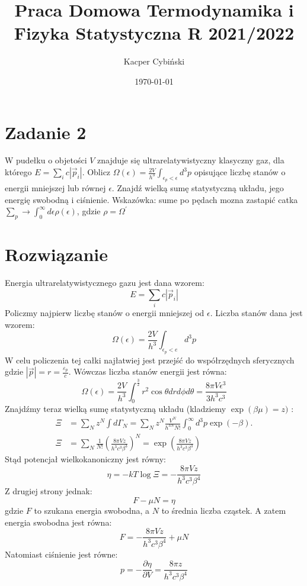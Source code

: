 \documentclass[12pt,a4paper]{article}
\title{Praca Domowa Termodynamika i Fizyka Statystyczna R 2021/2022}
\author{Kacper Cybiński}
\date{\today}
\begin{document}
\maketitle

\section{Zadanie 2}

W pudełku o objetości $V$ znajduje się ultrarelatywistyczny klasyczny gaz, dla którego $E=\sum_{i} c\left|\vec{p}_{i}\right|$. Oblicz $\Omega(\epsilon)=\frac{2 V}{h^{3}} \int_{\epsilon_{p}<\epsilon} d^{3} p$ opisujące liczbę stanów o energii mniejszej lub równej $\epsilon$. Znajdź wielką sumę statystyczną układu, jego energię swobodną i ciśnienie.
Wskazówka: sume po pędach mozna zastapić catka $\sum_{p} \longrightarrow \int_{0}^{\infty} d \epsilon \rho(\epsilon)$, gdzie $\rho=\Omega^{\prime}$

\section{Rozwiązanie}

Energia ultrarelatywistycznego gazu jest dana wzorem:
$$
E=\sum_{i} c\left|\vec{p}_{i}\right|
$$
Policzmy najpierw liczbę stanów o energii mniejszej od $\epsilon$. Liczba stanów dana jest wzorem:
$$
\Omega(\epsilon)=\frac{2 V}{h^{3}} \int_{\epsilon_{p}<e} d^{3} p
$$
W celu policzenia tej całki najłatwiej jest przejść do współrzędnych sferycznych gdzie $|\vec{p}|=r=\frac{\varepsilon_{p}}{c}$. Wówczas liczba stanów energii jest równa:
$$
\Omega(\epsilon)=\frac{2 V}{h^{3}} \int_{0}^{\frac{3}{2}} r^{2} \cos \theta d r d \phi d \theta=\frac{8 \pi V \epsilon^{3}}{3 h^{3} c^{3}}
$$
Znajdźmy teraz wielką sumę statystyczną układu (kladziemy $\exp (\beta \mu)=z)$ :
\begin{align*}
\Xi &=\sum_{N} z^{N} \int d \Gamma_{N}=\sum_{N} z^{N} \frac{V^{N}}{h^{3 N} N !}\int _ { 0 } ^ { \infty } d ^ { 3 } p \operatorname{exp} (-\beta). \\
\Xi &=\sum_{N} \frac{1}{N !}\left(\frac{8 \pi V z}{h^{3} c^{3} \beta^{3}}\right)^{N}=\exp \left(\frac{8 \pi V z}{h^{3} c^{3} \beta^{3}}\right)
\end{align*}
Stąd potencjał wielkokanoniczny jest równy:
$$
\eta=-k T \log \Xi=-\frac{8 \pi V z}{h^{3} c^{3} \beta^{4}}
$$
Z drugiej strony jednak:
$$
F-\mu N=\eta
$$
gdzie $F$ to szukana energia swobodna, a $N$ to średnia liczba cząstek. A zatem energia swobodna jest równa:
$$
F=-\frac{8 \pi V z}{h^{3} c^{3} \beta^{4}}+\mu N
$$
Natomiast ciśnienie jest równe:
$$
p=-\frac{\partial \eta}{\partial V}=\frac{8 \pi z}{h^{3} c^{3} \beta^{4}}
$$
\end{document}
